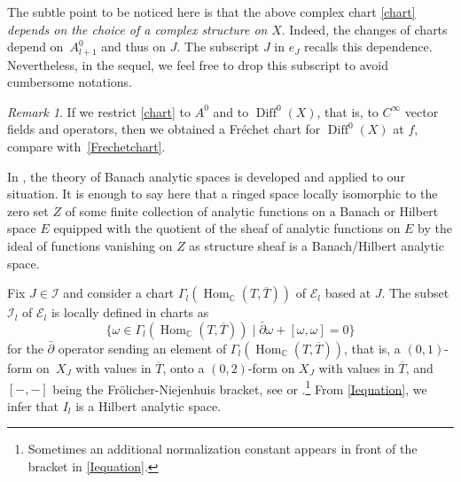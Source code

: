\documentclass[JEP,XML,SOM,Unicode]{cedram}
\let\mathcal\mathscr
\DeclareMathOperator{\Diff}{Diff}
\DeclareMathOperator{\Hom}{Hom}
\theoremstyle{plain}
\theoremstyle{definition}
\theoremstyle{remark}
\newtheorem{remark}[theorem]{Remark}
\numberwithin{equation}{section}
\newcommand{\CC}{{\mathbb{C}}}
\newcommand{\cI}{\mathcal{I}}
\begin{document}
The subtle point to be noticed here is that the above complex chart \eqref{chart} \emph{depends on the choice of a complex structure on} $X$. Indeed, the changes of charts depend on~$A^0_{l+1}$ and thus on $J$. The subscript $J$ in $e_J$ recalls this dependence. Nevertheless, in the sequel, we feel free to drop this subscript to avoid cumbersome notations.

\begin{remark}
\label{rkFrechetHilbertchart}
If we restrict \eqref{chart} to $A^0$ and to $\Diff^0(X)$, that is, to $C^\infty$ vector fields and operators, then we obtained a Fréchet chart for $\Diff^0(X)$ at $f$, compare with~\eqref{Frechetchart}.
\end{remark}
In \cite{Douady}, the theory of Banach analytic spaces is developed and applied to our situation. It is enough to say here that a ringed space locally isomorphic to the zero set $Z$ of some finite collection of analytic functions on a Banach or Hilbert space $E$ equipped with the quotient of the sheaf of analytic functions on $E$ by the ideal of functions vanishing on $Z$ as structure sheaf is a Banach/Hilbert analytic space.

Fix $J\in\cI$ and consider a chart $\Gamma_l(\Hom_{\CC}(T,\overline{T}))$ of $\mathcal E_l$ based at $J$. The subset $\cI_l$ of $\mathcal E_l$ is locally defined in charts as
\begin{equation}
\label{Iequation}
\{\omega\in \Gamma_l(\Hom_{\CC}(T,\overline{T}))\mid \bar\partial\omega+[\omega,\omega]=0\}
\end{equation}
for the $\bar\partial$ operator sending an element of $\Gamma_l(\Hom_{\CC}(T,\overline{T}))$, that is, a $(0,1)$-form on~$X_J$ with values in $\overline{T}$, onto a $(0,2)$-form on $X_J$ with values in $\overline{T}$, and $[-,-]$ being the Frölicher-Niejenhuis bracket, see \cite{Kur1} or \cite[Ch.\,4.1]{MK}.\footnote{Sometimes an additional normalization constant appears in front of the bracket in \eqref{Iequation}.} From \eqref{Iequation}, we infer that $I_l$ is a Hilbert analytic space.
\end{document}
